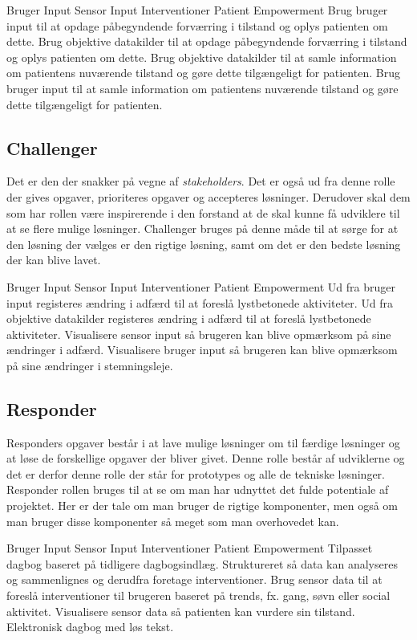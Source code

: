 \coord
  {Bruger Input}
  {Sensor Input}
  {Interventioner}
  {Patient Empowerment}
  {Brug bruger input til at opdage påbegyndende forværring i tilstand og oplys patienten om dette.}
  {Brug objektive datakilder til at opdage påbegyndende forværring i tilstand og oplys patienten om dette.}
  {Brug objektive datakilder til at samle information om patientens nuværende tilstand og gøre dette tilgængeligt for patienten.}
  {Brug bruger input til at samle information om patientens nuværende tilstand og gøre dette tilgængeligt for patienten.}

\subsection{Challenger}
Det er den der snakker på vegne af \textit{stakeholders}.
Det er også ud fra denne rolle der gives opgaver, prioriteres opgaver og accepteres løsninger.
Derudover skal dem som har rollen være inspirerende i den forstand at de skal kunne få udviklere til at se flere mulige løsninger. 
Challenger bruges på denne måde til at sørge for at den løsning der vælges er den rigtige løsning, samt om det er den bedste løsning der kan blive lavet.

\coord
  {Bruger Input}
  {Sensor Input}
  {Interventioner}
  {Patient Empowerment}
  {Ud fra bruger input registeres ændring i adfærd til at foreslå lystbetonede aktiviteter.}
  {Ud fra objektive datakilder registeres ændring i adfærd til at foreslå lystbetonede aktiviteter.}
  {Visualisere sensor input så brugeren kan blive opmærksom på sine ændringer i adfærd.}
  {Visualisere bruger input så brugeren kan blive opmærksom på sine ændringer i stemningsleje.}

\subsection{Responder}
Responders opgaver består i at lave mulige løsninger om til færdige løsninger og at løse de forskellige opgaver der bliver givet.
Denne rolle består af udviklerne og det er derfor denne rolle der står for prototypes og alle de tekniske løsninger.
Responder rollen bruges til at se om man har udnyttet det fulde potentiale af projektet.
Her er der tale om man bruger de rigtige komponenter, men også om man bruger disse komponenter så meget som man overhovedet kan. 

\coord
  {Bruger Input}
  {Sensor Input}
  {Interventioner}
  {Patient Empowerment}
  {Tilpasset dagbog baseret på tidligere dagbogsindlæg.
    Struktureret så data kan analyseres og sammenlignes og derudfra foretage interventioner.}
  {Brug sensor data til at foreslå interventioner til brugeren baseret på trends, fx. gang, søvn eller social aktivitet.}
  {Visualisere sensor data så patienten kan vurdere sin tilstand.}
  {Elektronisk dagbog med løs tekst.}

